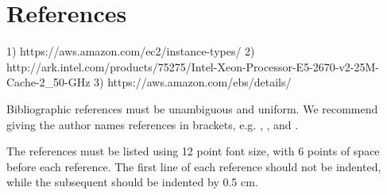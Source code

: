 \documentclass[12pt]{article}
\begin{document}
\section{References}

1) https://aws.amazon.com/ec2/instance-types/
2) http://ark.intel.com/products/75275/Intel-Xeon-Processor-E5-2670-v2-25M-Cache-2\_50-GHz
3) https://aws.amazon.com/ebs/details/

Bibliographic references must be unambiguous and uniform.  We recommend giving
the author names references in brackets, e.g. \cite{knuth:84},
\cite{boulic:91}, and \cite{smith:99}.

The references must be listed using 12 point font size, with 6 points of space
before each reference. The first line of each reference should not be
indented, while the subsequent should be indented by 0.5 cm.



\end{document}
